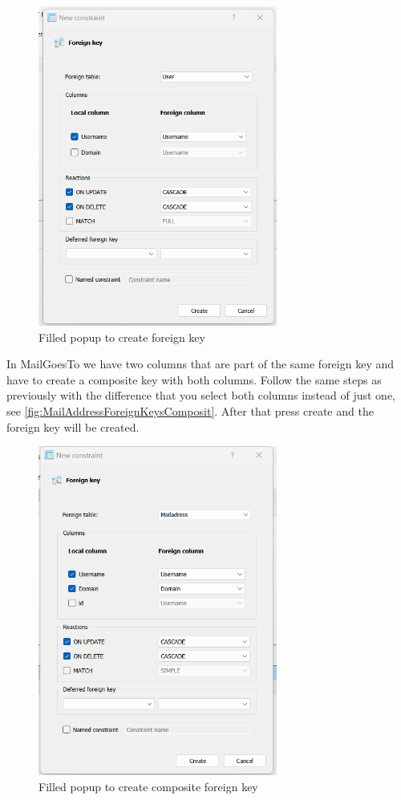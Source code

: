 \documentclass[a4paper,11pt,oneside]{article}
\begin{document}
\begin{sloppypar}
\begin{figure}[!htb]
  \includegraphics[width=0.7\textwidth]{sqlitestudio/create_foreign_key/foreign_key_populated.png}
  \caption{Filled popup to create foreign key}
  \label{fig:MailAddressForeignKeysFilledWindow}
\end{figure}   
In MailGoesTo we have two columns that are part of the same foreign key and have to create a composite key with both columns. Follow the same steps as previously with the difference that you select both columns instead of just one, see \autoref{fig:MailAddressForeignKeysComposit}. After that press create and the foreign key will be created.
\begin{figure}[!htb]
  \centering
  \includegraphics[width=0.7\textwidth]{sqlitestudio/create_foreign_key/composite_foreign_key.png}
  \caption{Filled popup to create composite foreign key}
  \label{fig:MailAddressForeignKeysComposit}
\end{figure}   

\end{sloppypar}
\end{document}
